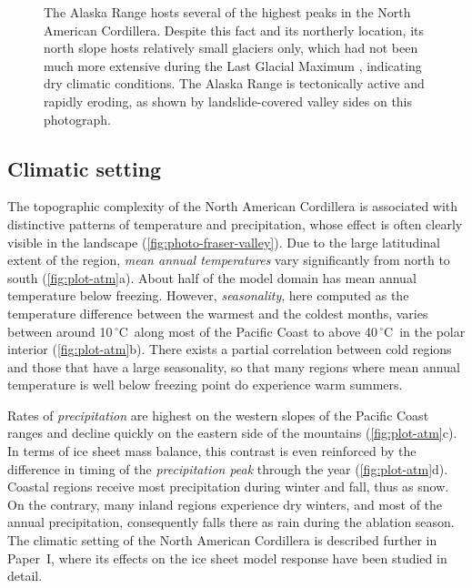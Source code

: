 \documentclass{article}
\newcommand{\unit}[1]{\ensuremath{\mathrm{#1}}}
\newcommand{\degree}[0]{\ensuremath{^{\circ}}}
\newcommand{\degC}[0]{\unit{{\degree}C}}
\newcommand{\CCLI}[0]{Paper~I}      %
\begin{document}
\begin{figure}
  \centering
  \caption{The Alaska Range hosts several of the highest peaks in the North
           American Cordillera. Despite this fact and its northerly location,
           its north slope hosts relatively small glaciers only, which had not
           been much more extensive during the Last Glacial Maximum
           \citep{Kaufman.Manley.2004}, indicating dry climatic conditions.
           The Alaska Range is tectonically active and rapidly eroding, as
           shown by landslide-covered valley sides on this photograph.}
  \label{fig:photo-alaska-range}
\end{figure}

\subsection{Climatic setting}

The topographic complexity of the North American Cordillera is associated with
distinctive patterns of temperature and precipitation, whose effect is often
clearly visible in the landscape (\cref{fig:photo-fraser-valley}). Due to the
large latitudinal extent of the region, \emph{mean annual temperatures} vary
significantly from north to south (\cref{fig:plot-atm}a). About half of the
model domain has mean annual temperature below freezing. However,
\emph{seasonality},
here computed as the temperature difference between the warmest and the coldest
months, varies between around 10\,\degC\ along most of the Pacific Coast to
above 40\,\degC\ in the polar interior (\cref{fig:plot-atm}b). There exists a
partial correlation between cold regions and those that have a large
seasonality, so that many regions where mean annual temperature is well below
freezing point do experience warm summers.

Rates of \emph{precipitation} are highest on the western slopes of the Pacific
Coast
ranges and decline quickly on the eastern side of the mountains
(\cref{fig:plot-atm}c). In terms of ice sheet mass balance, this contrast is
even reinforced by the difference in timing of the \emph{precipitation peak}
through
the year (\cref{fig:plot-atm}d). Coastal regions receive most precipitation
during winter and fall, thus as snow. On the contrary, many inland regions
experience dry winters, and most of the annual precipitation,
consequently falls there
as rain during the ablation season. The climatic setting of the North American
Cordillera is described further in \CCLI, where its effects on the ice sheet
model response have been studied in detail.
\end{document}
